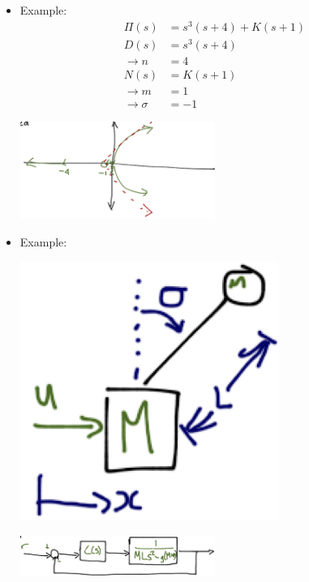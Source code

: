 \begin{enumerate}
\begin{enumerate}
\begin{itemize}
                    \item Example:
                        \begin{align*}
                            \Pi(s) &= s^3 (s+4) + K(s+1) \\
                            D(s) &= s^3 (s+4) \\
                            \rightarrow n &= 4 \\
                            N(s) &= K(s+1) \\
                            \rightarrow m &= 1 \\
                            \rightarrow \sigma &= -1
                        \end{align*}

                        \begin{center}\includegraphics[width=0.5\textwidth,keepaspectratio]{images/6-2-d.png}\end{center}
                    \item Example:

                        \begin{center}\includegraphics{images/6-2-e.png}\end{center}

                        \begin{center}\includegraphics[width=0.5\textwidth,keepaspectratio]{images/6-2-f.png}\end{center}


\end{itemize}
\end{enumerate}
\end{enumerate}
